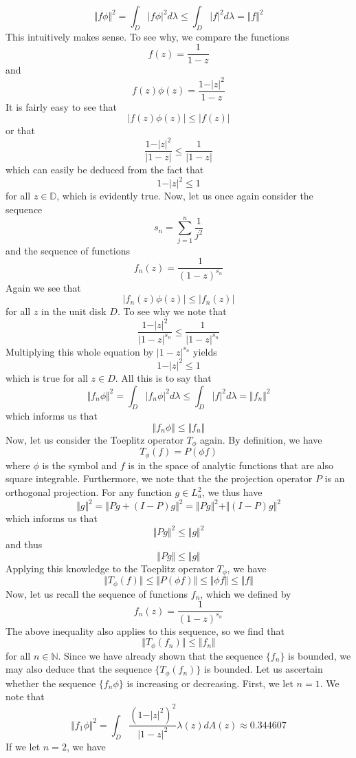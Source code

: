 \documentclass[12pt]{article}
\begin{document}
\[
\Vert f\phi \Vert^2 = \int_D \vert f\phi \vert^2 d\lambda \leq \int_D \vert f \vert^2 d\lambda = \Vert f \Vert^2
\] This intuitively makes sense. To see why, we compare the functions
\[
f(z) = \frac{1}{1-z}
\] and 
\[
f(z)\phi(z) = \frac{1 - \vert z \vert^2}{1-z}
\] It is fairly easy to see that
\[
\vert f(z)\phi(z) \vert \leq \vert f(z) \vert 
\] or that
\[
\frac{1-\vert z \vert^2}{\vert 1 - z\vert} \leq \frac{1}{\vert 1 - z \vert}
\] which can easily be deduced from the fact that
\[
1 - \vert z \vert^2 \leq 1 
\] for all $z \in \mathbb{D}$, which is evidently true. Now, let us once again consider the sequence 
\[
s_n = \sum_{j=1}^n \frac{1}{j^2}
\] and the sequence of functions
\[
f_n(z) = \frac{1}{(1-z)^{s_n}}
\] Again we see that
\[
\vert f_n(z) \phi(z) \vert \leq \vert f_n(z) \vert
\] for all $z$ in the unit disk $D$. To see why we note that
\[
\frac{1- \vert z \vert^2}{\vert 1 - z\vert^{s_n}} \leq \frac{1}{\vert 1 - z \vert^{s_n}}
\] Multiplying this whole equation by $\vert 1 - z \vert^{s_n}$ yields
\[
1 - \vert z \vert^2 \leq 1
\] which is true for all $z \in D$. All this is to say that
\[
\Vert f_n \phi \Vert^2 = \int_D \vert f_n \phi \vert^2 d\lambda \leq  \int_D \vert f \vert^2 d\lambda =  \Vert f_n \Vert^2
\] which informs us that
\[
\Vert f_n \phi \Vert \leq \Vert f_n \Vert
\] Now, let us consider the Toeplitz operator $T_\phi$ again. By definition, we have
\[
T_\phi(f) = P(\phi f)
\] where $\phi$ is the symbol and $f$ is in the space of analytic functions that are also square integrable. Furthermore, we note that the the projection operator $P$ is an orthogonal projection. For any function $g \in L_a^2$, we thus have
\[
\Vert g \Vert^2 = \Vert Pg + (I - P)g \Vert^2 = \Vert Pg \Vert^2 + \Vert (I - P)g \Vert^2  
\] which informs us that
\[
\Vert Pg \Vert^2 \leq \Vert g \Vert^2
\] and thus
\[
\Vert Pg \Vert \leq \Vert g \Vert
\] Applying this knowledge to the Toeplitz operator $T_\phi$, we have
\[
\Vert T_\phi(f) \Vert \leq \Vert P(\phi f) \Vert \leq \Vert \phi f \Vert \leq \Vert f \Vert
\] Now, let us recall the sequence of functions $f_n$, which we defined by
\[
f_n(z) = \frac{1}{(1-z)^{s_n}}
\] The above inequality also applies to this sequence, so we find that
\[
\Vert T_\phi(f_n) \Vert \leq \Vert f_n \Vert
\] for all $n \in \mathbb{N}$. Since we have already shown that the sequence $\{f_n\}$ is bounded, we may also deduce that the sequence $\{T_\phi(f_n)\}$ is bounded. Let us ascertain whether the sequence $\{f_n \phi\}$ is increasing or decreasing. First, we let $n = 1$. We note that
\[
\Vert f_1 \phi \Vert^2 = \int_D \frac{(1-\vert z \vert^2)^2}{\vert 1 - z\vert^2} \lambda(z) dA(z) \approx 0.344607
\] If we let $n=2$, we have
\end{document}
